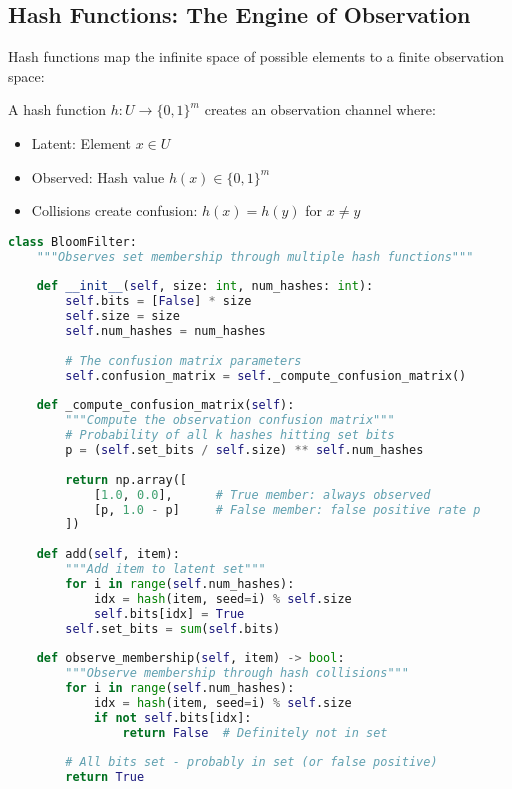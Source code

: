 \subsection{Hash Functions: The Engine of Observation}

Hash functions map the infinite space of possible elements to a finite observation space:

\begin{definition}
A hash function $h: U \to \{0,1\}^m$ creates an observation channel where:
\begin{itemize}
\item Latent: Element $x \in U$
\item Observed: Hash value $h(x) \in \{0,1\}^m$
\item Collisions create confusion: $h(x) = h(y)$ for $x \neq y$
\end{itemize}
\end{definition}

\begin{lstlisting}[language=Python, caption={Bloom filter as observation through hashing}]
class BloomFilter:
    """Observes set membership through multiple hash functions"""
    
    def __init__(self, size: int, num_hashes: int):
        self.bits = [False] * size
        self.size = size
        self.num_hashes = num_hashes
        
        # The confusion matrix parameters
        self.confusion_matrix = self._compute_confusion_matrix()
    
    def _compute_confusion_matrix(self):
        """Compute the observation confusion matrix"""
        # Probability of all k hashes hitting set bits
        p = (self.set_bits / self.size) ** self.num_hashes
        
        return np.array([
            [1.0, 0.0],      # True member: always observed
            [p, 1.0 - p]     # False member: false positive rate p
        ])
    
    def add(self, item):
        """Add item to latent set"""
        for i in range(self.num_hashes):
            idx = hash(item, seed=i) % self.size
            self.bits[idx] = True
        self.set_bits = sum(self.bits)
    
    def observe_membership(self, item) -> bool:
        """Observe membership through hash collisions"""
        for i in range(self.num_hashes):
            idx = hash(item, seed=i) % self.size
            if not self.bits[idx]:
                return False  # Definitely not in set
        
        # All bits set - probably in set (or false positive)
        return True
\end{lstlisting}

